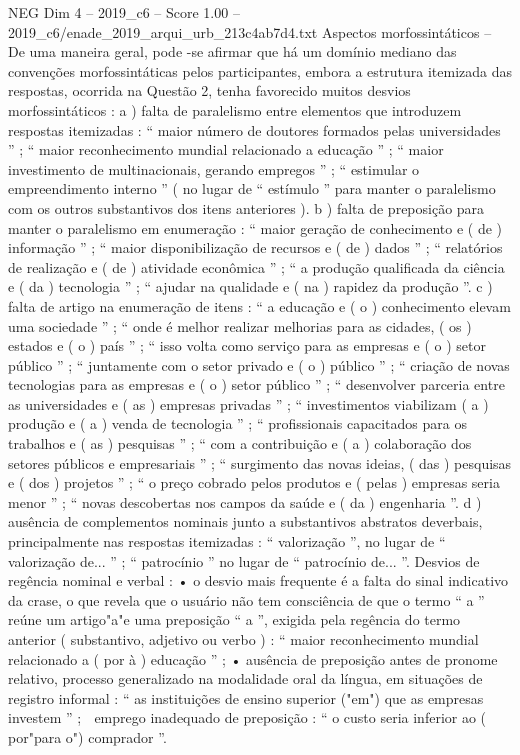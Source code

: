 \begin{textsample}{NEG Dim 4 – 2019\_c6 – Score 1.00 – 2019\_c6/enade\_2019\_arqui\_urb\_213c4ab7d4.txt}
Aspectos morfossintáticos – De uma maneira geral, pode -se afirmar que há um domínio mediano das convenções morfossintáticas pelos participantes, embora a estrutura itemizada das respostas, ocorrida na Questão 2, tenha favorecido muitos desvios morfossintáticos : a ) falta de paralelismo entre elementos que introduzem respostas itemizadas : “ maior número de doutores formados pelas universidades ” ; “ maior reconhecimento mundial relacionado a educação ” ; “ maior investimento de multinacionais, gerando empregos ” ; “ estimular o empreendimento interno ” ( no lugar de “ estímulo ” para manter o paralelismo com os outros substantivos dos itens anteriores ). b ) falta de preposição para manter o paralelismo em enumeração : “ maior geração de conhecimento e ( de ) informação ” ; “ maior disponibilização de recursos e ( de ) dados ” ; “ relatórios de realização e ( de ) atividade econômica ” ; “ a produção qualificada da ciência e ( da ) tecnologia ” ; “ ajudar na qualidade e ( na ) rapidez da produção ”. c ) falta de artigo na enumeração de itens : “ a educação e ( o ) conhecimento elevam uma sociedade ” ; “ onde é melhor realizar melhorias para as cidades, ( os ) estados e ( o ) país ” ; “ isso volta como serviço para as empresas e ( o ) setor público ” ; “ juntamente com o setor privado e ( o ) público ” ; “ criação de novas tecnologias para as empresas e ( o ) setor público ” ; “ desenvolver parceria entre as universidades e ( as ) empresas privadas ” ; “ investimentos viabilizam ( a ) produção e ( a ) venda de tecnologia ” ; “ profissionais capacitados para os trabalhos e ( as ) pesquisas ” ; “ com a contribuição e ( a ) colaboração dos setores públicos e empresariais ” ; “ surgimento das novas ideias, ( das ) pesquisas e ( dos ) projetos ” ; “ o preço cobrado pelos produtos e ( pelas ) empresas seria menor ” ; “ novas descobertas nos campos da saúde e ( da ) engenharia ”. d ) ausência de complementos nominais junto a substantivos abstratos deverbais, principalmente nas respostas itemizadas : “ valorização ”, no lugar de “ valorização de... ” ; “ patrocínio ” no lugar de “ patrocínio de... ”.
Desvios de regência nominal e verbal : • o desvio mais frequente é a falta do sinal indicativo da crase, o que revela que o usuário não tem consciência de que o termo “ a ” reúne um artigo"a"e uma preposição “ a ”, exigida pela regência do termo anterior ( substantivo, adjetivo ou verbo ) : “ maior reconhecimento mundial relacionado a ( por à ) educação ” ; • ausência de preposição antes de pronome relativo, processo generalizado na modalidade oral da língua, em situações de registro informal : “ as instituições de ensino superior ("em") que as empresas investem ” ;  emprego inadequado de preposição : “ o custo seria inferior ao ( por"para o") comprador ”.

\end{textsample}

